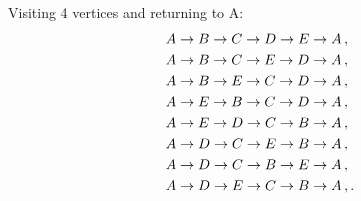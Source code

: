 \begin{subquestions}
Visiting 4 vertices and returning to A:
\begin{align}
& A \rightarrow B \rightarrow C \rightarrow D \rightarrow E \rightarrow A\,, \nonumber \\
& A \rightarrow B \rightarrow C \rightarrow E \rightarrow D \rightarrow A \,, \nonumber \\
& A \rightarrow B \rightarrow E \rightarrow C \rightarrow D \rightarrow A \,, \nonumber \\
& A \rightarrow E \rightarrow B \rightarrow C \rightarrow D \rightarrow A \,, \nonumber \\
& A \rightarrow E \rightarrow D \rightarrow C \rightarrow B \rightarrow A \,, \nonumber \\
& A \rightarrow D \rightarrow C \rightarrow E \rightarrow B \rightarrow A \,, \nonumber \\ 
& A \rightarrow D \rightarrow C \rightarrow B \rightarrow E \rightarrow A \,, \nonumber \\
& A \rightarrow D \rightarrow E \rightarrow C \rightarrow B \rightarrow A \,, \nonumber .
\end{align}

\end{subquestions}
